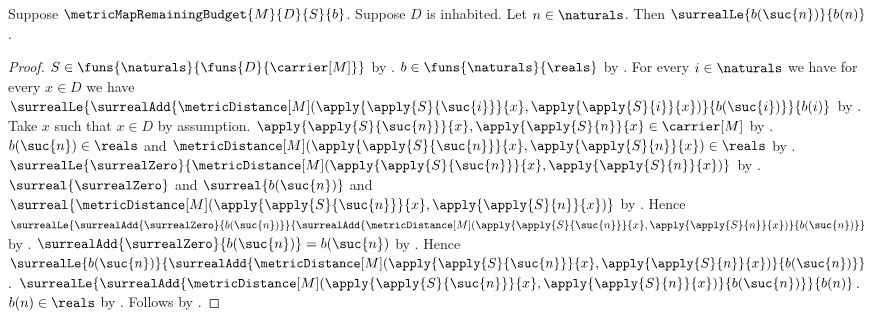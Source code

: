 \begin{proposition}\label{metric_map_budget_antitone_successor}
    Suppose $\metricMapRemainingBudget{M}{D}{S}{b}$.
    Suppose $D$ is inhabited.
    Let $n\in\naturals$.
    Then $\surrealLe{b(\suc{n})}{b(n)}$.
\end{proposition}
\begin{proof}
    $S\in\funs{\naturals}{\funs{D}{\carrier[M]}}$
        by .
    $b\in\funs{\naturals}{\reals}$
        by .
    For every $i\in\naturals$ we have for every $x\in D$ we have
        $\surrealLe{
            \surrealAdd{
                \metricDistance[M]
                    (\apply{\apply{S}{\suc{i}}}{x},
                     \apply{\apply{S}{i}}{x})}
                {b(\suc{i})}}
            {b(i)}$
        by .
    Take $x$ such that $x\in D$ by assumption.
    $\apply{\apply{S}{\suc{n}}}{x},
        \apply{\apply{S}{n}}{x}\in\carrier[M]$
        by .
    $b(\suc{n})\in\reals$ and
        $\metricDistance[M]
            (\apply{\apply{S}{\suc{n}}}{x},
             \apply{\apply{S}{n}}{x})\in\reals$
        by .
    $\surrealLe{\surrealZero}{
        \metricDistance[M]
            (\apply{\apply{S}{\suc{n}}}{x},
             \apply{\apply{S}{n}}{x})}$
        by .
    $\surreal{\surrealZero}$ and $\surreal{b(\suc{n})}$ and
        $\surreal{\metricDistance[M]
            (\apply{\apply{S}{\suc{n}}}{x},
             \apply{\apply{S}{n}}{x})}$
        by .
    Hence
        $\surrealLe{\surrealAdd{\surrealZero}{b(\suc{n})}}
            {\surrealAdd{
                \metricDistance[M]
                    (\apply{\apply{S}{\suc{n}}}{x},
                     \apply{\apply{S}{n}}{x})}
                {b(\suc{n})}}$
        by
        .
    $\surrealAdd{\surrealZero}{b(\suc{n})}=b(\suc{n})$
        by .
    Hence
        $\surrealLe{b(\suc{n})}
            {\surrealAdd{
                \metricDistance[M]
                    (\apply{\apply{S}{\suc{n}}}{x},
                     \apply{\apply{S}{n}}{x})}
                {b(\suc{n})}}$.
    $\surrealLe{
        \surrealAdd{
            \metricDistance[M]
                (\apply{\apply{S}{\suc{n}}}{x},
                 \apply{\apply{S}{n}}{x})}
            {b(\suc{n})}}
        {b(n)}$.
    $b(n)\in\reals$ by .
    Follows by
        .
\end{proof}

